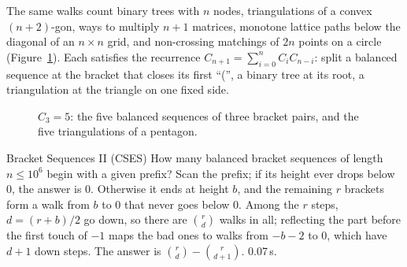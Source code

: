 The same walks count binary trees with $n$ nodes, triangulations of a convex $(n+2)$-gon, ways to multiply $n + 1$ matrices, monotone
lattice paths below the diagonal of an $n \times n$ grid, and non-crossing matchings of $2n$ points on a circle (Figure~\ref{fig:catalan}).
Each satisfies the recurrence $C_{n+1} = \sum_{i=0}^{n} C_i C_{n-i}$: split a balanced sequence at the bracket that closes its first
``('', a binary tree at its root, a triangulation at the triangle on one fixed side.

\begin{figure}[htbp]
\centering
{}
\caption{$C_3 = 5$: the five balanced sequences of three bracket pairs, and the five triangulations of a pentagon.}
\label{fig:catalan}
\end{figure}

\begin{problem}{Bracket Sequences II (CSES)}
How many balanced bracket sequences of length $n \le 10^6$ begin with a given prefix?
\solution Scan the prefix; if its height ever drops below 0, the answer is 0. Otherwise it ends at height $b$, and the remaining $r$
brackets form a walk from $b$ to 0 that never goes below 0. Among the $r$ steps, $d = (r + b)/2$ go down, so there are $\binom{r}{d}$
walks in all; reflecting the part before the first touch of $-1$ maps the bad ones to walks from $-b - 2$ to 0, which have $d + 1$ down
steps. The answer is $\binom{r}{d} - \binom{r}{d+1}$. 0.07\,s.
\end{problem}


